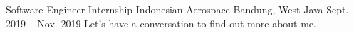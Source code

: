\begin{cventries}



\cventry
{Software Engineer Internship} %
{Indonesian Aerospace} %
{Bandung, West Java} %
{Sept. 2019 -- Nov. 2019} %
{ %
Let's have a conversation to find out more about me.
}






\end{cventries}
